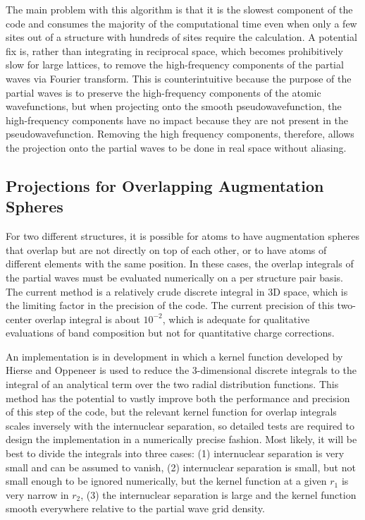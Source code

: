 \documentclass[12pt]{article}
\begin{document}
The main problem with this algorithm is that it is the slowest component of the code
and consumes the majority of the computational time even when only a few sites out
of a structure with hundreds of sites require the calculation. A potential fix is,
rather than integrating in reciprocal space, which becomes prohibitively slow for large
lattices, to remove the high-frequency components of the partial waves via Fourier transform.
This is counterintuitive because the purpose of the partial waves is to preserve the high-frequency
components of the atomic wavefunctions, but when projecting onto the smooth pseudowavefunction,
the high-frequency components have no impact because they are not present in the pseudowavefunction.
Removing the high frequency components, therefore, allows the projection onto the partial waves
to be done in real space without aliasing.

\subsection{Projections for Overlapping Augmentation Spheres}

For two different structures, it is possible for atoms to have augmentation spheres
that overlap but are not directly on top of each other, or to have atoms of different elements
with the same position. In these cases, the overlap integrals of the partial waves
must be evaluated numerically on a per structure pair basis. The current method is a relatively
crude discrete integral in 3D space, which is the limiting factor in the precision of the code.
The current precision of this two-center overlap integral is about $10^{-2}$, which is adequate
for qualitative evaluations of band composition but not for quantitative charge corrections.

An implementation is in development in which a kernel function developed by Hierse and
Oppeneer is used to reduce the 3-dimensional discrete integrals
to the integral of an analytical term over the two radial distribution functions.\cite{hierse_kernel} 
This method has the potential to vastly improve both the performance and precision of
this step of the code, but the relevant kernel function for overlap integrals
scales inversely with the internuclear separation, so detailed tests are required
to design the implementation in a numerically precise fashion. Most likely, it will be
best to divide the integrals into three cases: (1) internuclear separation is very small
and can be assumed to vanish, (2) internuclear separation is small, but not small enough
to be ignored numerically, but the kernel function at a given $r_1$ is very narrow
in $r_2$, (3) the internuclear separation is large and the kernel function smooth everywhere
relative to the partial wave grid density.
\end{document}
